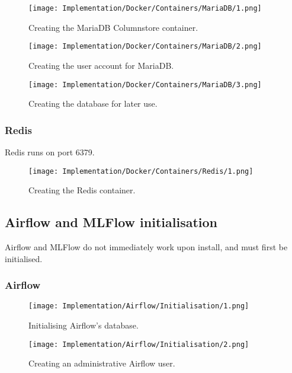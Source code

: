 \begin{figure}[H]
    \centering
    \texttt{[image: Implementation/Docker/Containers/MariaDB/1.png]}
    \caption{Creating the MariaDB Columnstore container.}
    \label{fig:CreateMCS}
\end{figure}

\begin{figure}[H]
    \centering
    \texttt{[image: Implementation/Docker/Containers/MariaDB/2.png]}
    \caption{Creating the user account for MariaDB.}
    \label{fig:CreateMCSUser}
\end{figure}

\begin{figure}[H]
    \centering
    \texttt{[image: Implementation/Docker/Containers/MariaDB/3.png]}
    \caption{Creating the database for later use.}
    \label{fig:CreateDB}
\end{figure}

\pagebreak 
\subsubsection{Redis}
Redis runs on port 6379.

\begin{figure}[H]
    \centering
    \texttt{[image: Implementation/Docker/Containers/Redis/1.png]}
    \caption{Creating the Redis container.}
    \label{fig:CreateRedis}
\end{figure}


\subsection{Airflow and MLFlow initialisation}
Airflow and MLFlow do not immediately work upon install, and must first be initialised.

\subsubsection{Airflow}
\begin{figure}[H]
    \centering
    \texttt{[image: Implementation/Airflow/Initialisation/1.png]}
    \caption{Initialising Airflow's database.}
    \label{fig:AirflowInit}
\end{figure}

\begin{figure}[H]
    \centering
    \texttt{[image: Implementation/Airflow/Initialisation/2.png]}
    \caption{Creating an administrative Airflow user.}
    \label{fig:AirflowUser1}
\end{figure}

